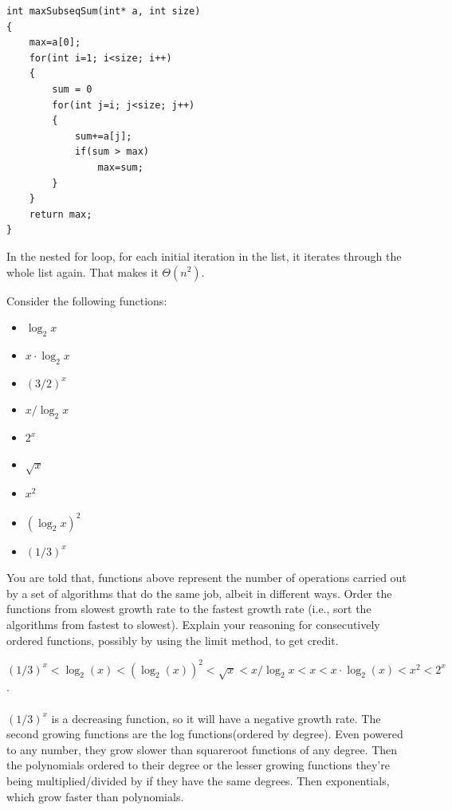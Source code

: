 \documentclass[answers,addpoints,11pt]{exam}
\begin{document}
\begin{questions}
\begin{parts}
\begin{lstlisting}
int maxSubseqSum(int* a, int size)
{
    max=a[0];
    for(int i=1; i<size; i++)
    {
        sum = 0
        for(int j=i; j<size; j++)
        {
            sum+=a[j];
            if(sum > max)
                max=sum;
        }
    }
    return max;
}
\end{lstlisting}

\begin{solution}
In the nested for loop, for each initial iteration in the list, it iterates through the whole list again. That makes it $\Theta(n^2)$.
\end{solution}

\end{parts}

\newpage
\question[10]
    Consider the following functions: 
    \begin{itemize}
        \item $\log_2x$
        \item $x\cdot \log_2x$
        \item $(3/2)^x$
        \item $x/\log_2x$
        \item $2^x$
        \item $\sqrt{x}$
        \item $x^2$
        \item $(\log_2x)^2$
        \item $(1/3)^x$
    \end{itemize}
    
    You are told that, functions above represent the number of operations carried out by a set of algorithms that do the same job, albeit in different ways. Order the functions from slowest growth rate to the fastest growth rate (i.e., sort the algorithms from fastest to slowest). Explain your reasoning for consecutively ordered functions, possibly by using the limit method, to get credit.

\begin{solution}
$(1/3)^x < \log_2(x) < (\log_2(x))^2 < \sqrt x < x/\log_2x < x < x \cdot \log_2(x) < x^2 < 2^x$.\\\\
$(1/3)^x$ is a decreasing function, so it will have a negative growth rate. The second growing functions are the log functions(ordered by degree). Even powered to any number, they grow slower than squareroot functions of any degree. Then the polynomials ordered to their degree or the lesser growing functions they're being multiplied/divided by if they have the same degrees. Then exponentials, which grow faster than polynomials.


\end{solution}
\end{questions}
\end{document}
